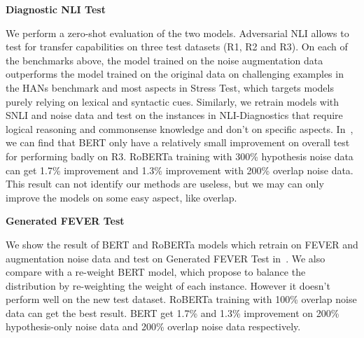 \noindent\textbf{Diagnostic NLI Test} 

We perform a zero-shot evaluation of the two models. Adversarial NLI allows to test for transfer
capabilities on three test datasets (R1, R2 and R3).
On each of the benchmarks above, the model trained on the noise augmentation 
data outperforms
the model trained on the original data on challenging examples in the HANs benchmark and 
most aspects in Stress Test, which
targets models purely relying on lexical and syntactic cues. 
Similarly, we retrain models with SNLI and noise data and test 
on the instances in NLI-Diagnostics that require logical reasoning and commonsense knowledge and 
don't on specific aspects. 
In~, we can find that BERT only have a 
relatively small improvement on overall test for performing badly on R3. 
RoBERTa training with 300\% hypothesis noise data can get 1.7\% 
improvement and 1.3\% improvement with 200\% overlap noise data. 
This result can not identify our methods are useless, but we may can only 
improve the models on some easy aspect, like overlap. 

\noindent\textbf{Generated FEVER Test} 

We show the result of BERT and RoBERTa models which retrain on FEVER and 
augmentation noise data and test on Generated FEVER Test in~. 
We also compare with a re-weight  BERT model, which propose to balance the distribution by
 re-weighting the weight of each instance. However it doesn't perform well on the new test dataset. 
 RoBERTa training with 100\% overlap noise data can get the best result. BERT get 1.7\% and 1.3\% 
 improvement on 200\% hypothesis-only noise data and 200\% overlap noise data respectively.
 
